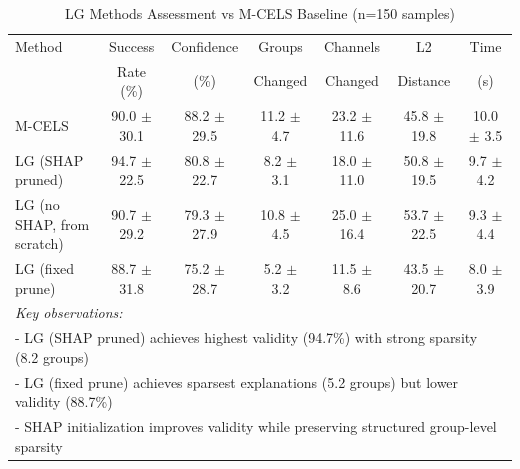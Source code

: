 \begin{table}[ht]
\centering
\caption{LG Methods Assessment vs M-CELS Baseline (n=150 samples)}
\label{tab:lg_methods_vs_mcels}
\begin{tabular}{lcccccc}
\hline
Method & Success & Confidence & Groups & Channels & L2 & Time \\
       & Rate (\%) & (\%) & Changed & Changed & Distance & (s) \\
\hline
M-CELS & 90.0 $\pm$ 30.1 & 88.2 $\pm$ 29.5 & 11.2 $\pm$ 4.7 & 23.2 $\pm$ 11.6 & 45.8 $\pm$ 19.8 & 10.0 $\pm$ 3.5 \\
LG (SHAP pruned) & 94.7 $\pm$ 22.5 & 80.8 $\pm$ 22.7 & 8.2 $\pm$ 3.1 & 18.0 $\pm$ 11.0 & 50.8 $\pm$ 19.5 & 9.7 $\pm$ 4.2 \\
LG (no SHAP, from scratch) & 90.7 $\pm$ 29.2 & 79.3 $\pm$ 27.9 & 10.8 $\pm$ 4.5 & 25.0 $\pm$ 16.4 & 53.7 $\pm$ 22.5 & 9.3 $\pm$ 4.4 \\
LG (fixed prune) & 88.7 $\pm$ 31.8 & 75.2 $\pm$ 28.7 & 5.2 $\pm$ 3.2 & 11.5 $\pm$ 8.6 & 43.5 $\pm$ 20.7 & 8.0 $\pm$ 3.9 \\
\hline
\multicolumn{7}{l}{\textit{Key observations:}} \\
\multicolumn{7}{l}{- LG (SHAP pruned) achieves highest validity (94.7\%) with strong sparsity (8.2 groups)} \\
\multicolumn{7}{l}{- LG (fixed prune) achieves sparsest explanations (5.2 groups) but lower validity (88.7\%)} \\
\multicolumn{7}{l}{- SHAP initialization improves validity while preserving structured group-level sparsity} \\
\hline
\end{tabular}
\end{table}